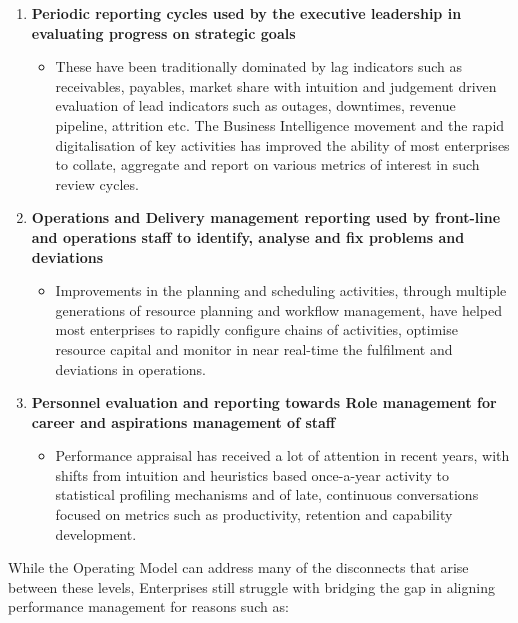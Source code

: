 \begin{enumerate}
    \item \textbf{Periodic reporting cycles used by the executive leadership in evaluating progress on strategic goals}
    \begin{itemize}
        \item These have been traditionally dominated by lag indicators such as receivables, payables, market share with
              intuition and judgement driven evaluation of lead indicators such as outages, downtimes, revenue pipeline,
              attrition etc.
              The Business Intelligence movement and the rapid digitalisation of key activities has improved the
              ability of most enterprises to collate, aggregate and report on various metrics of interest in such
              review cycles.
    \end{itemize}
    \item \textbf{Operations and Delivery management reporting used by front-line and operations staff to identify,
        analyse and fix problems and deviations}
    \begin{itemize}
        \item Improvements in the planning and scheduling activities, through multiple generations of resource planning
              and workflow management, have helped most enterprises to rapidly configure chains of activities,
              optimise resource capital and monitor in near real-time the fulfilment and deviations in operations.
    \end{itemize}
    \item \textbf{Personnel evaluation and reporting towards Role management for career and aspirations management of
          staff}
    \begin{itemize}
        \item Performance appraisal has received a lot of attention in recent years, with shifts from intuition and
              heuristics based once-a-year activity to statistical profiling mechanisms and of late,
              continuous conversations focused on metrics such as productivity, retention and capability development.
    \end{itemize}
\end{enumerate}

While the Operating Model can address many of the disconnects that arise between these levels,
Enterprises still struggle with bridging the gap in aligning performance management for reasons such as:

